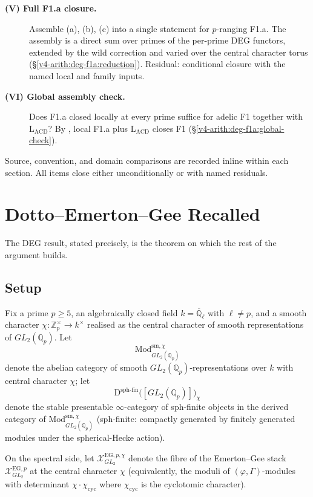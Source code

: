\begin{description}
\item[\textbf{(V) Full F1.a closure.}] Assemble (a), (b), (c) into a
single statement for \(p\)-ranging F1.a. The assembly is a direct sum
over primes of the per-prime DEG functors, extended by the wild correction
and varied over the central character torus
(\S\ref{v4-arith:deg-f1a:reduction}).
Residual: conditional closure with the named local and family inputs.

\item[\textbf{(VI) Global assembly check.}]
Does F1.a closed locally at every prime suffice for adelic F1 together
with \(\mathrm{L}_{\mathrm{ACD}}\)? By ,
local F1.a plus \(\mathrm{L}_{\mathrm{ACD}}\) closes F1
(\S\ref{v4-arith:deg-f1a:global-check}).
\end{description}

Source, convention, and domain comparisons are recorded inline within
each section. All items close either unconditionally or with named
residuals.

\section{Dotto--Emerton--Gee Recalled}
\label{v4-arith:deg-f1a:deg-recalled}

The DEG result, stated precisely, is the theorem on which
the rest of the argument builds.

\subsection{Setup}

Fix a prime \(p\geq 5\), an algebraically closed field
\(k=\overline{\mathbb{Q}}_{\ell}\) with \(\ell\neq p\), and a smooth
character \(\chi\colon\mathbb{Z}_{p}^{\times}\to k^{\times}\)
realised as the central character of smooth representations of
\(GL_{2}(\mathbb{Q}_{p})\). Let
\[
\mathrm{Mod}_{GL_{2}(\mathbb{Q}_{p})}^{\mathrm{sm},\chi}
\]
denote the abelian category of smooth \(GL_{2}(\mathbb{Q}_{p})\)-representations
over \(k\) with central character \(\chi\); let
\[
\mathrm{D}^{\mathrm{sph\text{-}fin}}\bigl([GL_{2}(\mathbb{Q}_{p})]\bigr)_{\chi}
\]
denote the stable presentable \(\infty\)-category of sph-finite
objects in the derived category of
\(\mathrm{Mod}_{GL_{2}(\mathbb{Q}_{p})}^{\mathrm{sm},\chi}\) (sph-finite:
compactly generated by finitely generated modules under the
spherical-Hecke action).

On the spectral side, let
\(\mathcal{X}^{\mathrm{EG},p,\chi}_{GL_{2}}\) denote the fibre of the
Emerton--Gee stack \(\mathcal{X}^{\mathrm{EG},p}_{GL_{2}}\) at the
central character \(\chi\) (equivalently, the moduli of \((\varphi,\Gamma)\)-modules
with determinant \(\chi\cdot\chi_{\mathrm{cyc}}\) where \(\chi_{\mathrm{cyc}}\)
is the cyclotomic character).

